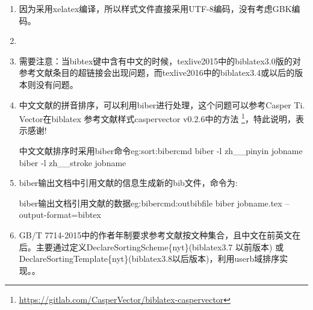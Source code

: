 \begin{enumerate}
  \item 因为采用xelatex编译，所以样式文件直接采用UTF-8编码，没有考虑GBK编码。

  \item {}

  \item 需要注意：当bibtex键中含有中文的时候，texlive2015中的biblatex3.0版的对参考文献条目的超链接会出现问题，而texlive2016中的biblatex3.4或以后的版本则没有问题。

  \item {\heiti 中文文献的拼音排序，可以利用biber进行处理，这个问题可以参考Casper Ti. Vector在biblatex 参考文献样式caspervector v0.2.6中的方法
      \footnote{\url{https://gitlab.com/CasperVector/biblatex-caspervector}}，特此说明，表示感谢!}

        \begin{codetex}{中文文献排序时采用biber命令}{eg:sort:bibercmd}
        biber -l zh__pinyin jobname
        biber -l zh__stroke jobname
        \end{codetex}

  \item biber输出文档中引用文献的信息生成新的bib文件，命令为:
        \begin{codetex}{biber输出文档引用文献的数据}{eg:bibercmd:outbibfile}
        biber jobname.tex --output-format=bibtex
        \end{codetex}


  \item GB/T 7714-2015中的作者年制要求参考文献按文种集合，且中文在前英文在后。主要通过定义DeclareSortingScheme\{nyt\}(biblatex3.7 以前版本) 或DeclareSortingTemplate\{nyt\}(biblatex3.8以后版本)，利用userb域排序实现。。



\end{enumerate}

